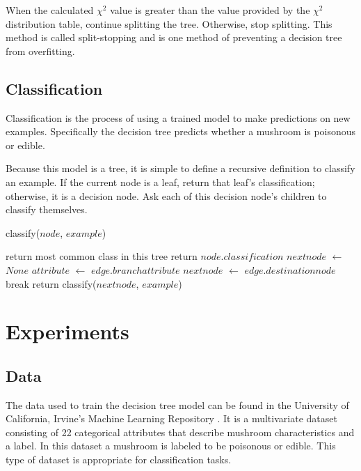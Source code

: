 \documentclass{IEEEtran}
\begin{document}
When the calculated $\chi^2$ value is greater than the value provided by
the $\chi^2$ distribution table, continue splitting the tree. Otherwise,
stop splitting. This method is called split-stopping and is one method
of preventing a decision tree from overfitting.


\subsection{Classification}
Classification is the process of using a trained model to make
predictions on new examples. Specifically the decision tree predicts
whether a mushroom is poisonous or edible.

Because this model is a tree, it is simple to define a recursive
definition to classify an example. If the current node is a leaf,
return that leaf's classification; otherwise, it is a decision
node. Ask each of this decision node's children to classify themselves.


\begin{algorithm}
\caption{classify($node$, $example$)}
\begin{algorithmic}
\Statex {}
  \State return most common class in this tree
\EndIf
{}
  \State return $node.classification$
\EndIf
\State $nextnode$ $\leftarrow$ $None$
  \State $attribute$ $\leftarrow$ $edge.branchattribute$
    \State $nextnode$ $\leftarrow$ $edge.destinationnode$
    \State break
  \EndIf
\EndFor
\State return classify($nextnode$, $example$)
\end{algorithmic}
\end{algorithm}

\section{Experiments}
\subsection{Data}
The data used to train the decision tree model can be found in the
University of California, Irvine's Machine Learning
Repository \parencite{schlimmer1981mushroom}. It is a multivariate dataset
consisting of 22 categorical attributes that describe mushroom
characteristics and a label. In this dataset a mushroom is labeled to
be poisonous or edible. This type of dataset is appropriate for
classification tasks.
\end{document}
